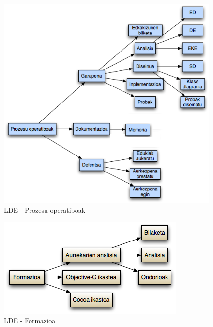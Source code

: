 \begin{figure}[htp]
\begin{center}
\includegraphics[scale=0.5]{Pictures/Chapter3/LDE-PO.png}
\caption{LDE - Prozesu operatiboak}
\label{lde-po}
\end{center}
\end{figure}
\begin{figure}[htp]
\begin{center}
\includegraphics[scale=0.5]{Pictures/Chapter3/LDE-Formazioa.png}
\caption{LDE - Formazioa}
\label{lde-formazioa}
\end{center}
\end{figure}

